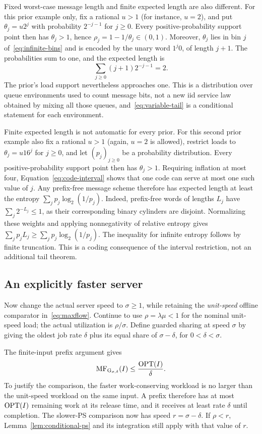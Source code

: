 Fixed worst-case message length and finite expected length are also different. For this prior example only, fix a rational $u>1$ (for instance, $u=2$), and put $\theta_j=u2^j$ with probability $2^{-j-1}$ for $j\geq0$. Every positive-probability support point then has $\theta_j>1$, hence $\rho_j=1-1/\theta_j\in(0,1)$. Moreover, $\theta_j$ lies in bin $j$ of~\eqref{eq:infinite-bins} and is encoded by the unary word $1^j0$, of length $j+1$. The probabilities sum to one, and the expected length is
\[
 \sum_{j\geq0}(j+1)2^{-j-1}=2.
\]
The prior's load support nevertheless approaches one. This is a distribution over queue environments used to count message bits, not a new iid service law obtained by mixing all those queues, and~\eqref{eq:variable-tail} is a conditional statement for each environment.

Finite expected length is not automatic for every prior. For this second prior example also fix a rational $u>1$ (again, $u=2$ is allowed), restrict loads to $\theta_j=u16^j$ for $j\geq0$, and let $(p_j)_{j\geq0}$ be a probability distribution. Every positive-probability support point then has $\theta_j>1$. Requiring inflation at most four, Equation~\eqref{eq:code-interval} shows that one code can serve at most one such value of $j$. Any prefix-free message scheme therefore has expected length at least the entropy $\sum_j p_j\log_2(1/p_j)$. Indeed, prefix-free words of lengths $L_j$ have $\sum_j2^{-L_j}\leq1$, as their corresponding binary cylinders are disjoint. Normalizing these weights and applying nonnegativity of relative entropy gives $\sum_jp_jL_j\geq\sum_jp_j\log_2(1/p_j)$. The inequality for infinite entropy follows by finite truncation. This is a coding consequence of the interval restriction, not an additional tail theorem.

\subsection{An explicitly faster server}
Now change the actual server speed to $\sigma\geq1$, while retaining the \emph{unit-speed} offline comparator in~\eqref{eq:maxflow}. Continue to use $\rho=\lambda\mu<1$ for the nominal unit-speed load; the actual utilization is $\rho/\sigma$. Define guarded sharing at speed $\sigma$ by giving the oldest job rate $\delta$ plus its equal share of $\sigma-\delta$, for $0<\delta<\sigma$.

The finite-input prefix argument gives
\begin{equation}\label{eq:fast-competitive}
 \operatorname{MF}_{\operatorname{G}_{\sigma,\delta}}(I)\leq\frac{\operatorname{OPT}(I)}\delta.
\end{equation}
To justify the comparison, the faster work-conserving workload is no larger than the unit-speed workload on the same input. A prefix therefore has at most $\operatorname{OPT}(I)$ remaining work at its release time, and it receives at least rate $\delta$ until completion. The slower-PS comparison now has speed $r=\sigma-\delta$. If $\rho<r$, Lemma~\ref{lem:conditional-ps} and its integration still apply with that value of $r$.

